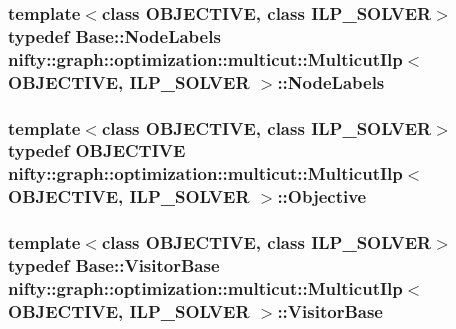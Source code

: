 \subsubsection[{Node\+Labels}]{\setlength{\rightskip}{0pt plus 5cm}template$<$class O\+B\+J\+E\+C\+T\+I\+V\+E, class I\+L\+P\+\_\+\+S\+O\+L\+V\+E\+R$>$ typedef {\bf Base\+::\+Node\+Labels} {\bf nifty\+::graph\+::optimization\+::multicut\+::\+Multicut\+Ilp}$<$ O\+B\+J\+E\+C\+T\+I\+V\+E, I\+L\+P\+\_\+\+S\+O\+L\+V\+E\+R $>$\+::{\bf Node\+Labels}}\label{classnifty_1_1graph_1_1optimization_1_1multicut_1_1MulticutIlp_a0b5224bc8998dda829c920e8d3338fee}
\hypertarget{classnifty_1_1graph_1_1optimization_1_1multicut_1_1MulticutIlp_a1c9fe5899608fc9c8e32bde6648c8278}{}
\subsubsection[{Objective}]{\setlength{\rightskip}{0pt plus 5cm}template$<$class O\+B\+J\+E\+C\+T\+I\+V\+E, class I\+L\+P\+\_\+\+S\+O\+L\+V\+E\+R$>$ typedef O\+B\+J\+E\+C\+T\+I\+V\+E {\bf nifty\+::graph\+::optimization\+::multicut\+::\+Multicut\+Ilp}$<$ O\+B\+J\+E\+C\+T\+I\+V\+E, I\+L\+P\+\_\+\+S\+O\+L\+V\+E\+R $>$\+::{\bf Objective}}\label{classnifty_1_1graph_1_1optimization_1_1multicut_1_1MulticutIlp_a1c9fe5899608fc9c8e32bde6648c8278}
\hypertarget{classnifty_1_1graph_1_1optimization_1_1multicut_1_1MulticutIlp_a0dd77b07238eb761a1db58b058c0186c}{}
\subsubsection[{Visitor\+Base}]{\setlength{\rightskip}{0pt plus 5cm}template$<$class O\+B\+J\+E\+C\+T\+I\+V\+E, class I\+L\+P\+\_\+\+S\+O\+L\+V\+E\+R$>$ typedef {\bf Base\+::\+Visitor\+Base} {\bf nifty\+::graph\+::optimization\+::multicut\+::\+Multicut\+Ilp}$<$ O\+B\+J\+E\+C\+T\+I\+V\+E, I\+L\+P\+\_\+\+S\+O\+L\+V\+E\+R $>$\+::{\bf Visitor\+Base}}\label{classnifty_1_1graph_1_1optimization_1_1multicut_1_1MulticutIlp_a0dd77b07238eb761a1db58b058c0186c}
\hypertarget{classnifty_1_1graph_1_1optimization_1_1multicut_1_1MulticutIlp_ab78a646c0aea8aa633ff7155f349d7a6}{}
